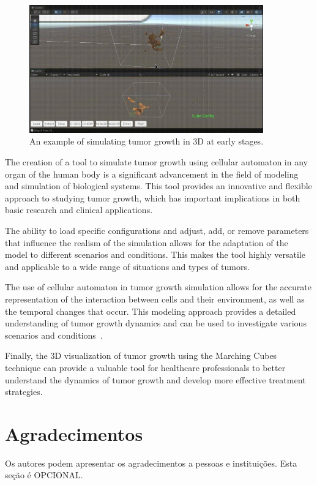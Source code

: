 \documentclass[a4paper,11pt]{article}
\begin{document}
{\begin{figure}[h]
  \centering
  \includegraphics[width=0.9\textwidth]{tumor.jpg}
  \caption{An example of simulating tumor growth in 3D at early stages.}
\end{figure}

The creation of a tool to simulate tumor growth using cellular automaton in any organ of the human body is a significant advancement in the field of modeling and simulation of biological systems. This tool provides an innovative and flexible approach to studying tumor growth, which has important implications in both basic research and clinical applications.

The ability to load specific configurations and adjust, add, or remove parameters that influence the realism of the simulation allows for the adaptation of the model to different scenarios and conditions. This makes the tool highly versatile and applicable to a wide range of situations and types of tumors.

The use of cellular automaton in tumor growth simulation allows for the accurate representation of the interaction between cells and their environment, as well as the temporal changes that occur. This modeling approach provides a detailed understanding of tumor growth dynamics and can be used to investigate various scenarios and conditions~\cite{2}.

Finally, the 3D visualization of tumor growth using the Marching Cubes technique can provide a valuable tool for healthcare professionals to better understand the dynamics of tumor growth and develop more effective treatment strategies.

\section*{Agradecimentos}

Os autores podem apresentar os agradecimentos a pessoas e instituições. Esta seção é OPCIONAL.



}
\end{document}

